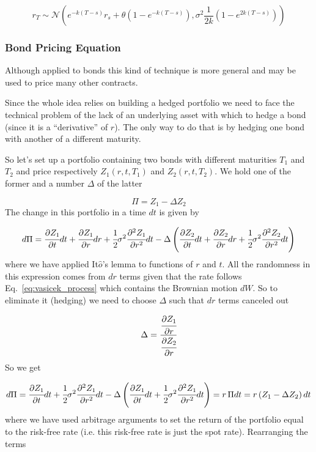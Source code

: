 \begin{equation}
r_T \sim \mathcal{N}(e^{-k(T-s)} r_s+\theta(1-e^{-k(T-s)}),\sigma^2 \frac {1}{2k}(1-e^{2k(T-s)}))
\end{equation}

\subsubsection{Bond Pricing Equation}\label{bond-pricing-equation}

Although applied to bonds this kind of technique is more general and may be used to price many other contracts.

Since the whole idea relies on building a hedged portfolio we need to face the technical problem of the lack of an underlying asset with which
to hedge a bond (since it is a ``derivative'' of $r$). The only way to do that is by hedging one bond with another of a different maturity.

So let's set up a portfolio containing two bonds with different maturities $T_1$ and $T_2$ and price respectively $Z_1(r, t, T_1)$
and $Z_2(r, t, T_2)$. We hold one of the former and a number $\Delta$ of the latter

\begin{equation*}
\Pi = Z_1-\Delta Z_2
\end{equation*}
The change in this portfolio in a time $dt$ is given by

\begin{equation*}
d\Pi = \cfrac{\partial Z_1}{\partial t}dt + \cfrac{\partial Z_1}{\partial r}dr + \cfrac{1}{2}\sigma^2 \cfrac{\partial^2 Z_1}{\partial r^2}dt - \Delta\left(\cfrac{\partial Z_2}{\partial t}dt + \cfrac{\partial Z_2}{\partial r}dr + \cfrac{1}{2}\sigma^2 \cfrac{\partial^2 Z_2}{\partial r^2}dt\right)
\end{equation*}
where we have applied It$\hat{o}$'s lemma to functions of $r$ and $t$. All the randomness in this expression comes from $dr$ terms given that the rate follows Eq.~\ref{eq:vasicek_process} which contains the Brownian motion $dW$. So to eliminate it (hedging) we need to choose $\Delta$ such that $dr$ terms canceled out

\begin{equation*}
\Delta = \cfrac{\cfrac{\partial Z_1}{\partial r}}{\cfrac{\partial Z_2}{\partial r}}
\end{equation*}
So we get

\begin{equation*}
d\Pi = \cfrac{\partial Z_1}{\partial t}dt + \cfrac{1}{2}\sigma^2 \cfrac{\partial^2 Z_1}{\partial r^2}dt - \Delta\left(\cfrac{\partial Z_1}{\partial t}dt + \cfrac{1}{2}\sigma^2 \cfrac{\partial^2 Z_1}{\partial r^2}dt\right) = r\, \Pi dt = r \left(Z_1 - \Delta Z_2\right)dt
\end{equation*}
where we have used arbitrage arguments to set the return of the portfolio equal to the risk-free rate (i.e. this risk-free rate is just the spot rate). Rearranging the terms

